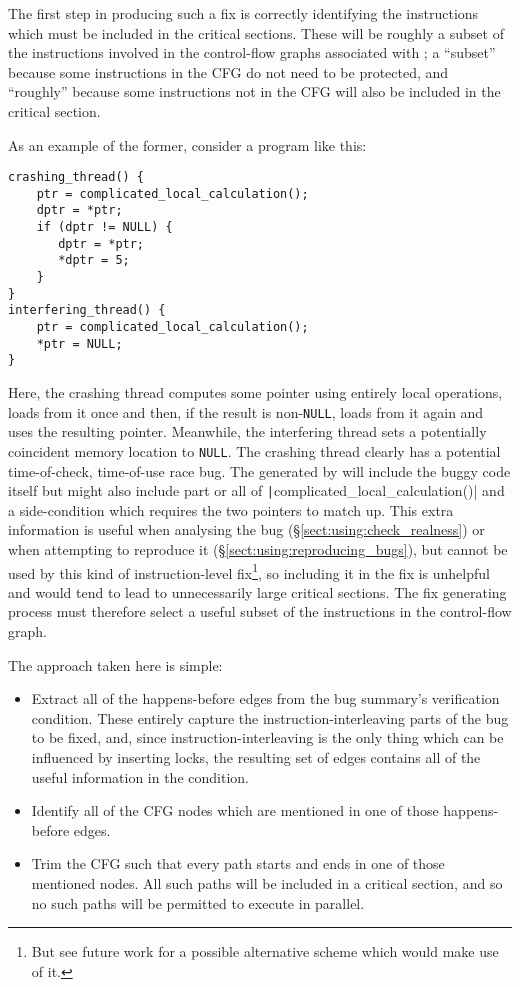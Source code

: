 The first step in producing such a fix is correctly identifying the
instructions which must be included in the critical sections.  These
will be roughly a subset of the instructions involved in the
control-flow graphs associated with \StateMachines; a ``subset''
because some instructions in the CFG do not need to be protected, and
``roughly'' because some instructions not in the CFG will also be
included in the critical section.

As an example of the former, consider a program like this:

\begin{verbatim}
crashing_thread() {
    ptr = complicated_local_calculation();
    dptr = *ptr;
    if (dptr != NULL) {
       dptr = *ptr;
       *dptr = 5;
    }
}
interfering_thread() {
    ptr = complicated_local_calculation();
    *ptr = NULL;
}
\end{verbatim}

Here, the crashing thread computes some pointer using entirely local
operations, loads from it once and then, if the result is
non-\texttt{NULL}, loads from it again and uses the resulting pointer.
Meanwhile, the interfering thread sets a potentially coincident memory
location to \texttt{NULL}.  The crashing thread clearly has a
potential time-of-check, time-of-use race bug.  The {\StateMachines}
generated by {\technique} will include the buggy code itself but might
also include part or all of \texttt|complicated\_local\_calculation()|
and a side-condition which requires the two pointers to match up.
This extra information is useful when analysing the bug
(\S\ref{sect:using:check_realness}) or when attempting to reproduce it
(\S\ref{sect:using:reproducing_bugs}), but cannot be used by this kind
of instruction-level fix\footnote{But see future work for a possible
  alternative scheme which would make use of it.}, so including it in
the fix is unhelpful and would tend to lead to unnecessarily large
critical sections.  The fix generating process must therefore select a
useful subset of the instructions in the control-flow graph.

The approach taken here is simple:

\begin{itemize}
\item
  Extract all of the happens-before edges from the bug summary's
  verification condition.  These entirely capture the
  instruction-interleaving parts of the bug to be fixed, and, since
  instruction-interleaving is the only thing which can be influenced
  by inserting locks, the resulting set of edges contains all of the
  useful information in the condition.
\item
  Identify all of the CFG nodes which are mentioned in one of those
  happens-before edges.
\item
  Trim the CFG such that every path starts and ends in one of those
  mentioned nodes.  All such paths will be included in a critical
  section, and so no such paths will be permitted to execute in
  parallel.
\end{itemize}


